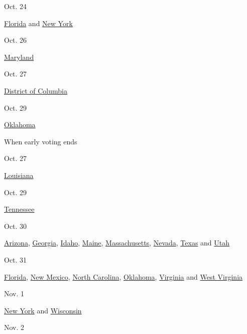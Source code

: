 Oct. 24

\href{https://dos.myflorida.com/elections/}{Florida} and
\href{https://www.elections.ny.gov/}{New York}

Oct. 26

\href{https://elections.maryland.gov/voting/index.html}{Maryland}

Oct. 27

\href{https://earlyvoting.dcboe.org/}{District of Columbia}

Oct. 29

\href{https://www.ok.gov/elections/}{Oklahoma}

When early voting ends

Oct. 27

\href{https://www.sos.la.gov/electionsandvoting/Pages/default.aspx}{Louisiana}

Oct. 29

\href{https://sos.tn.gov/products/elections/2020-election-calendar}{Tennessee}

Oct. 30

\href{https://azsos.gov/elections}{Arizona},
\href{https://sos.ga.gov/index.php/?section=elections}{Georgia},
\href{https://sos.idaho.gov/elections-division/}{Idaho},
\href{https://www.maine.gov/sos/cec/elec/}{Maine},
\href{https://www.sec.state.ma.us/ele/eleidx.htm}{Massachusetts},
\href{https://www.nvsos.gov/sos/elections}{Nevada},
\href{https://www.sos.state.tx.us/elections/laws/advisory2020-17.shtml\#October19}{Texas}
and \href{https://elections.utah.gov/}{Utah}

Oct. 31

\href{https://dos.myflorida.com/elections/}{Florida},
\href{https://www.sos.state.nm.us/voting-and-elections/voter-information-portal/absentee-and-early-voting/}{New
Mexico}, \href{https://www.ncsbe.gov/voting/vote-early-person}{North
Carolina}, \href{https://www.ok.gov/elections/}{Oklahoma},
\href{https://www.elections.virginia.gov/}{Virginia} and
\href{https://sos.wv.gov/elections/Pages/default.aspx}{West Virginia}

Nov. 1

\href{https://www.elections.ny.gov/}{New York} and
\href{https://elections.wi.gov/}{Wisconsin}

Nov. 2

